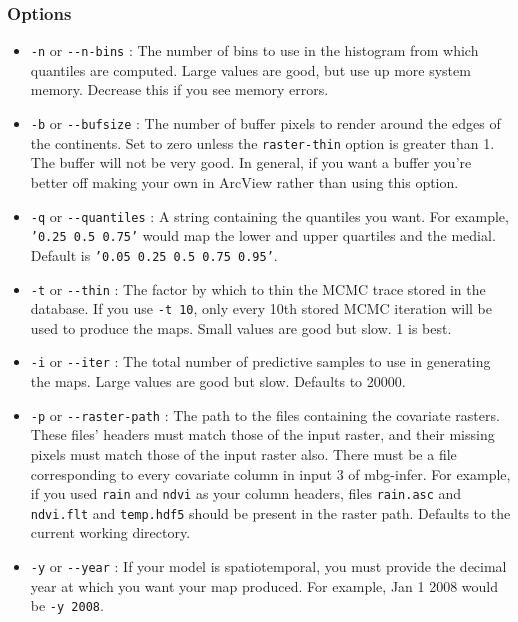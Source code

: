 \subsubsection{Options%
}
%
\begin{itemize}

\item \texttt{-n} or \texttt{-{}-n-bins} : The number of bins to use in the histogram from which quantiles
are computed. Large values are good, but use up more system memory. Decrease this if you
see memory errors.

\item \texttt{-b} or \texttt{-{}-bufsize} : The number of buffer pixels to render around the edges of the
continents. Set to zero unless the \texttt{raster-thin} option is greater than 1. The buffer
will not be very good. In general, if you want a buffer you're better off making your
own in ArcView rather than using this option.

\item \texttt{-q} or \texttt{-{}-quantiles} : A string containing the quantiles you want. For example,
\texttt{'0.25 0.5 0.75'} would map the lower and upper quartiles and the medial. Default is
\texttt{'0.05 0.25 0.5 0.75 0.95'}.

\item \texttt{-t} or \texttt{-{}-thin} : The factor by which to thin the MCMC trace stored in the database.
If you use \texttt{-t 10}, only every 10th stored MCMC iteration will be used to produce the maps.
Small values are good but slow. 1 is best.

\item \texttt{-i} or \texttt{-{}-iter} : The total number of predictive samples to use in generating the maps.
Large values are good but slow. Defaults to 20000.

\item \texttt{-p} or \texttt{-{}-raster-path} : The path to the files containing the covariate rasters. These
files' headers must match those of the input raster, and their missing pixels must match
those of the input raster also. There must be a file corresponding to every covariate column
in input 3 of mbg-infer. For example, if you used \texttt{rain} and \texttt{ndvi} as your column headers,
files \texttt{rain.asc} and \texttt{ndvi.flt} and \texttt{temp.hdf5} should be present in the raster path.
Defaults to the current working directory.

\item \texttt{-y} or \texttt{-{}-year} : If your model is spatiotemporal, you must provide the decimal year at
which you want your map produced. For example, Jan 1 2008 would be \texttt{-y 2008}.

\end{itemize}




